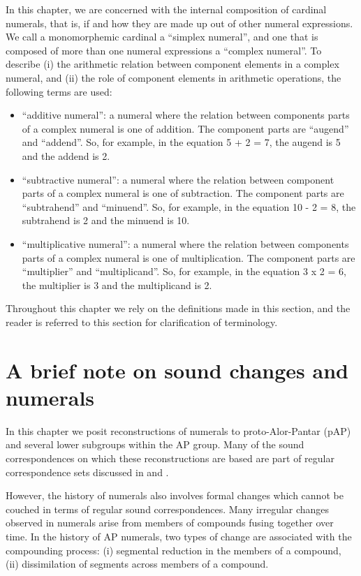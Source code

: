 In this chapter, we are concerned with the internal composition of cardinal numerals, that is, if and how they are made up out of other numeral expressions. We call a monomorphemic cardinal a ``simplex numeral'', and one that is composed of more than one numeral expressions a ``complex numeral''. To describe (i) the arithmetic relation between component elements in a complex numeral, and (ii) the role of component elements in arithmetic operations, the following terms are used:

\begin{itemize}
 \item ``additive numeral'': a numeral where the relation between components parts of a complex numeral is one of addition. The component parts are ``augend'' and ``addend''.  So, for example, in the equation 5 + 2 = 7, the augend is 5 and the addend is 2.
 \item ``subtractive numeral'': a numeral where the relation between component parts of a complex numeral is one of subtraction. The component parts are ``subtrahend'' and ``minuend''. So, for example, in the equation 10 - 2 = 8, the subtrahend is 2 and the minuend is 10.
 \item ``multiplicative numeral'': a numeral where the relation between components parts of a complex numeral is one of multiplication. The component parts are ``multiplier'' and ``multiplicand''.  So, for example, in the equation 3 x 2 = 6, the multiplier is 3 and the multiplicand is 2. 
\end{itemize}
 

Throughout this chapter we rely on the definitions made in this section, and the reader is referred to this section for clarification of terminology.

\section{A brief note on sound changes and numerals}\label{sec:6:3}
In this chapter we posit reconstructions of numerals to proto-Alor-Pantar (pAP) and several lower subgroups within the AP group. Many of the sound correspondences on which these reconstructions are based are part of regular correspondence sets discussed in \citet{HoltonEtAl2012} and \citet{HoltonRobinsonTVhistory}. 

  However, the history of numerals also involves formal changes which cannot be couched in terms of regular sound correspondences. Many irregular changes observed in numerals arise from members of compounds fusing together over time. In the history of AP numerals, two  types of change are associated with the compounding process: (i) segmental reduction in the members of a compound, (ii) dissimilation of segments across members of a compound. 

